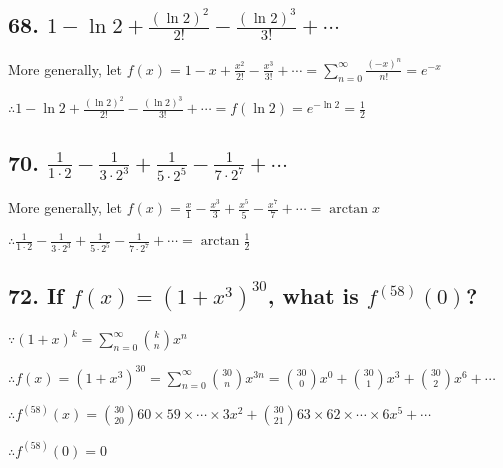 \documentclass{article}
\begin{document}
    \subsection*{68. $1 - \ln 2 + \frac{(\ln 2)^2}{2!} - \frac{(\ln 2)^3}{3!} + \cdots$}      

    More generally, let $f(x) = 1 - x + \frac{x^2}{2!} - \frac{x^3}{3!} + \cdots = \sum_{n=0}^\infty \frac{(-x)^n}{n!} = e^{-x}$

    $\therefore 1 - \ln 2 + \frac{(\ln 2)^2}{2!} - \frac{(\ln 2)^3}{3!} + \cdots = f(\ln 2) = e^{-\ln 2} = \frac 1 2$

    \subsection*{70. $\frac{1}{1 \cdot 2} - \frac{1}{3 \cdot 2^3} + \frac{1}{5 \cdot 2^5} - \frac{1}{7 \cdot 2^7} + \cdots$}

    More generally, let $f(x) = \frac{x}{1} - \frac{x^3}{3} + \frac{x^5}{5} - \frac{x^7}{7} + \cdots = \arctan x$

    $\therefore \frac{1}{1 \cdot 2} - \frac{1}{3 \cdot 2^3} + \frac{1}{5 \cdot 2^5} - \frac{1}{7 \cdot 2^7} + \cdots = \arctan \frac 1 2$

    \subsection*{72. If $f(x) = (1+x^3)^{30}$, what is $f^{(58)}(0)$?}

    $\because (1+x)^k = \sum_{n=0}^{\infty} {k \choose n} x^n$

    $\therefore f(x) = (1 + x^3)^{30} = \sum_{n=0}^\infty {30 \choose n}x^{3n} = {30 \choose 0}x^0 + {30 \choose 1}x^3 + {30 \choose 2}x^6 + \cdots$

    $\therefore f^{(58)}(x) = {30 \choose 20}60 \times 59 \times \cdots \times 3 x^2 + {30 \choose 21}63 \times 62 \times \cdots \times 6 x^5 + \cdots$

    $\therefore f^{(58)}(0) = 0$
\end{document}
